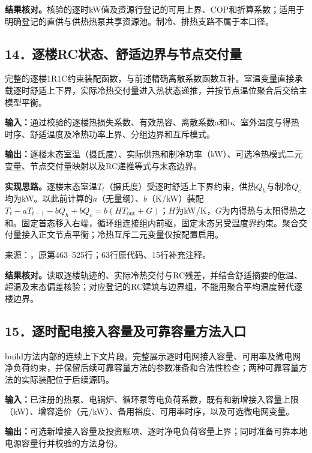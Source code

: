 \noindent\textbf{结果核对。}核验的逐时kW值及资源行登记的可用上界、COP和折算系数；适用于明确登记的直供与供热热泵共享资源池。制冷、排热支路不属于本口径。

\subsection*{14．逐楼RC状态、舒适边界与节点交付量}
完整的逐楼1R1C约束装配函数，与前述精确离散系数函数互补。室温变量直接承载逐时舒适上下界，实际冷热交付量进入热状态递推，并按节点温位聚合后交给主模型平衡。

\noindent\textbf{输入：}通过校验的逐楼热损失系数、有效热容、离散系数a和b、室外温度与得热时序、舒适温度及冷热功率上界、分组边界和互斥模式。\par
\noindent\textbf{输出：}逐楼末态室温（摄氏度）、实际供热和制冷功率（kW）、可选冷热模式二元变量、节点交付量映射以及RC递推等式与末态边界。\par

\noindent\textbf{实现思路。}逐楼末态室温$T_t$（摄氏度）受逐时舒适上下界约束，供热$Q_h$与制冷$Q_c$均为kW。以此前计算的$a$（无量纲）、$b$（K/kW）装配$T_t-aT_{t-1}-bQ_h+bQ_c=b(HT_{\mathrm{out}}+G)$；$H$为kW/K，$G$为内得热与太阳得热之和。固定首态移入右端，循环组连接组内前驱，固定末态另受温度界约束。聚合交付量接入正文节点平衡；冷热互斥二元变量仅按配置启用。

{\small 来源：，原第463--525行；63行原代码、15行补充注释。}\par

\begingroup
{}

\endgroup

\noindent\textbf{结果核对。}读取逐楼轨迹的、实际冷热交付与RC残差，并结合舒适摘要的低温、超温及末态偏差核验；对应登记的RC建筑与边界组，不能用聚合平均温度替代逐楼边界。

\subsection*{15．逐时配电接入容量及可靠容量方法入口}
build方法内部的连续上下文片段。完整展示逐时电网接入容量、可用率及微电网净负荷约束，并保留后续可靠容量方法的参数准备和合法性检查；两种可靠容量方法的实际装配位于后续源码。

\noindent\textbf{输入：}已注册的热泵、电锅炉、循环泵等电负荷系数，既有和新增接入容量上限（kW）、增容造价（元/kW）、备用裕度、可用率时序，以及可选微电网变量。\par
\noindent\textbf{输出：}可选新增接入容量及投资账项、逐时净电负荷容量上界；同时准备可靠本地电源容量行并校验的方法身份。\par

